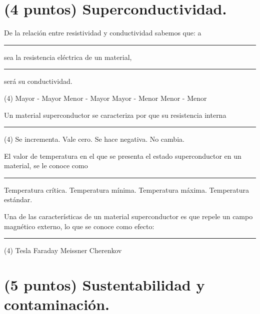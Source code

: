 \documentclass[12pt, letter]{exam}
\begin{document}
\begin{questions}
    \section{(4 puntos) Superconductividad.}

    \question De la relación entre resistividad y conductividad sabemos que: a \rule{2cm}{0.1mm} sea la resistencia eléctrica de un material, \rule{2cm}{0.1mm} será su conductividad.
    \begin{tasks}(4)
        \task Mayor - Mayor
        \task Menor - Mayor
        \task Mayor - Menor
        \task Menor - Menor
    \end{tasks}
    \question Un material superconductor se caracteriza por que su resistencia interna \rule{2cm}{0.1mm}
    \begin{tasks}(4)
        \task Se incrementa.
        \task Vale cero.
        \task Se hace negativa.
        \task No cambia.
    \end{tasks}

    \newpage

    \question El valor de temperatura en el que se presenta el estado superconductor en un material, se le conoce como \rule{2cm}{0.1mm}
    \begin{multicols}{2}
    \begin{tasks}
        \task Temperatura crítica.
        \task Temperatura mínima.
        \task Temperatura máxima.
        \task Temperatura estándar.
    \end{tasks}
    \end{multicols}
    \question Una de las características de un material superconductor es que repele un campo magnético externo, lo que se conoce como efecto: \rule{2cm}{0.1mm}
    \begin{tasks}(4)
        \task Tesla
        \task Faraday
        \task Meissner
        \task Cherenkov
    \end{tasks}

    \section{(5 puntos) Sustentabilidad y contaminación.}


\end{questions}
\end{document}
